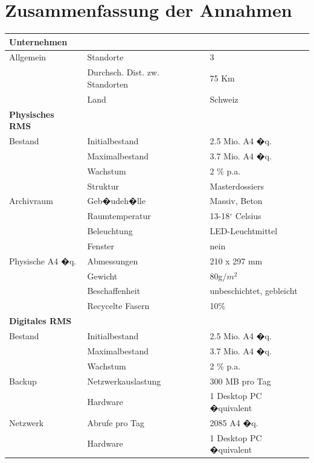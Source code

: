 \documentclass[a4paper,twoside,10pt]{report}
\begin{document}
\section{Zusammenfassung der Annahmen}
\begin{table}[h]
\begin{tabular}{|l|l|l|}
\hline
\rowcolor{Gray}
\textbf{Unternehmen} && \\
\hline
Allgemein			& Standorte  		& 3 \\
							& Durchsch. Dist. zw. Standorten & 75 Km \\
 							&	Land					& Schweiz \\
\hline
\rowcolor{Gray}
\textbf{Physisches RMS} && \\
\hline 
Bestand 			& Initialbestand			& 2.5 Mio. A4 �q.\\ 
							& Maximalbestand			& 3.7 Mio. A4 �q. \\

							& Wachstum 			& 2 \% p.a. \\
							& Struktur 			& Masterdossiers \\
\hline
Archivraum		& Geb�udeh�lle 				& Massiv, Beton \\
							& Raumtemperatur&	13-18$^{\circ}$ Celsius\\
							& Beleuchtung		&	LED-Leuchtmittel \\
							&	Fenster &	nein \\
\hline
Physische A4 �q.	&	Abmessungen & 210 x 297 mm \\
											& Gewicht	& 80g/$m^2$ \\
											&	Beschaffenheit & unbeschichtet, gebleicht \\
											& Recycelte Fasern & 10\% \\
\hline
\rowcolor{Gray}
\textbf{Digitales RMS} && \\
\hline
Bestand				& Initialbestand				& 2.5 Mio. A4 �q.\\
							&	Maximalbestand & 3.7 Mio. A4 �q. \\	
							& Wachstum			& 2 \% p.a. \\
\hline
Backup				& Netzwerkauslastung & 300 MB pro Tag \\
							& Hardware			& 1 Desktop PC �quivalent \\
							
\hline
Netzwerk			&	Abrufe pro Tag &  2085 A4 �q. \\	
							& Hardware			& 1 Desktop PC �quivalent \\ 							


\end{tabular}
\end{table}
\end{document}
